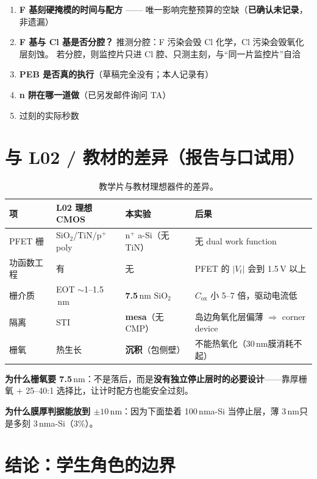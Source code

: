 \documentclass[UTF8,a4paper,11pt,fontset=windows]{ctexart}
\newcommand{\nm}{\ensuremath{\,\mathrm{nm}}}
\begin{document}
\begin{enumerate}
  \item \textbf{F 基刻硬掩模的时间与配方} —— 唯一影响完整预算的空缺（\textbf{已确认未记录}，非遗漏）
  \item \textbf{F 基与 Cl 基是否分腔？} 推测分腔：F 污染会毁 Cl 化学，Cl 污染会毁氧化层刻蚀。
        若分腔，则监控片只进 Cl 腔、只测主刻，与“同一片监控片”自洽
  \item \textbf{PEB 是否真的执行}（草稿完全没有；本人记录有）
  \item \textbf{n 阱在哪一道做}（已另发邮件询问 TA）
  \item 过刻的实际秒数
\end{enumerate}

\section{与 L02 / 教材的差异（报告与口试用）}

\begin{table}[h]
\centering
\small
\begin{tabularx}{\textwidth}{@{}>{\raggedright\arraybackslash}p{3.0cm} >{\raggedright\arraybackslash}p{4.2cm} >{\raggedright\arraybackslash}p{3.6cm} X@{}}
\toprule
\textbf{项} & \textbf{L02 理想 CMOS} & \textbf{本实验} & \textbf{后果} \\
\midrule
PFET 栅 & SiO$_2$/TiN/p$^+$ poly & n$^+$ a-Si（无 TiN） & 无 dual work function \\
功函数工程 & 有 & 无 & PFET 的 $|V_t|$ 会到 1.5\,V 以上 \\
栅介质 & EOT $\sim$1--1.5\nm & \textbf{7.5\nm} SiO$_2$ & $C_{\mathrm{ox}}$ 小 5--7 倍，驱动电流低 \\
隔离 & STI & \textbf{mesa}（无 CMP） & 岛边角氧化层偏薄 $\Rightarrow$ corner device \\
栅氧 & 热生长 & \textbf{沉积}（包侧壁） & 不能热氧化（30\nm 膜消耗不起） \\
\bottomrule
\end{tabularx}
\caption{教学片与教材理想器件的差异。}
\end{table}

\textbf{为什么栅氧要 7.5\nm}：不是落后，而是\textbf{没有独立停止层时的必要设计}——靠厚栅氧
$+$ 25--40:1 选择比，让计时配方也能安全过刻。

\textbf{为什么膜厚判据能放到 $\pm10\nm$}：因为下面垫着 100\nm a-Si 当停止层，薄 3\nm 只是多刻 3\nm a-Si（3\%）。

\section{结论：学生角色的边界}
\end{document}

